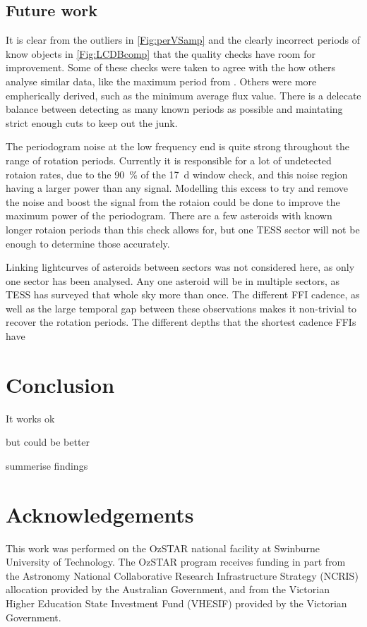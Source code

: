 \documentclass{UCreport}
\begin{document}
\subsection{Future work}

It is clear from the outliers in \autoref{Fig:perVSamp} and the clearly incorrect periods of know objects in \autoref{Fig:LCDBcomp} that the quality checks have room for improvement.
Some of these checks were  taken to agree with the how others analyse similar data, like the maximum period from \citet{McNeill2023}.
Others were more empherically derived, such as the minimum average flux value.
There is a delecate balance between detecting as many known periods as possible and maintating strict enough cuts to keep out the junk.

The periodogram noise at the low frequency end is quite strong throughout the range of rotation periods. 
Currently it is responsible for a lot of undetected rotaion rates, due to the \qty{90}{\percent} of the \qty{17}{\day} window check, and this noise region having a larger power than any signal.
Modelling this excess to try and remove the noise and boost the signal from the rotaion could be done to improve the maximum power of the periodogram. 
There are a few asteroids with known longer rotaion periods than this check allows for, but one TESS sector will not be enough to determine those accurately.

Linking lightcurves of asteroids between sectors was not considered here, as only one sector has been analysed.
Any one asteroid will be in multiple sectors, as TESS has surveyed that whole sky more than once. 
The different FFI cadence, as well as the large temporal gap between these observations makes it non-trivial to recover the rotation periods.
The different depths that the shortest cadence FFIs have \citep{MontillaHons}  



\section{Conclusion}\label{Sec:Conc}

It works ok

but could be better

summerise findings

\newpage %

\section*{Acknowledgements}
\small
This work was performed on the OzSTAR national facility at Swinburne University of Technology.
The OzSTAR program receives funding in part from the Astronomy National Collaborative Research Infrastructure Strategy (NCRIS) allocation provided by the Australian Government, and from the Victorian Higher Education State Investment Fund (VHESIF) provided by the Victorian Government.
\end{document}
